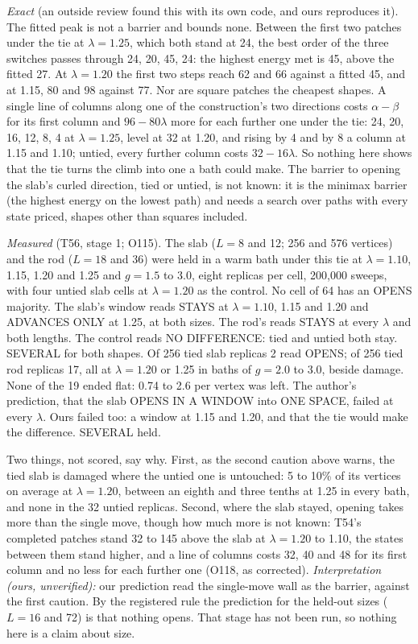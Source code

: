 \documentclass[aps,pre,10pt,twocolumn,superscriptaddress,nofootinbib]{revtex4-2}
\begin{document}
\emph{Exact} (an outside review found this with its own code, and ours reproduces it). The fitted peak is not a
barrier and bounds none. Between the first two patches under the tie at
$\lambda = 1.25$, which both stand at 24, the best order of the three switches passes through 24, 20, 45, 24: the
highest energy met is 45, above the fitted 27. At $\lambda = 1.20$ the first two steps reach 62 and 66 against a
fitted 45, and at 1.15, 80 and 98 against 77. Nor are square patches the cheapest shapes. A single line of columns
along one of the construction's two directions costs $\alpha - \beta$ for its first column and $96 - 80\lambda$ more
for each further one under the tie: 24, 20, 16, 12, 8, 4 at $\lambda = 1.25$, level at 32 at 1.20, and rising by 4
and by 8 a column at 1.15 and 1.10; untied, every further column costs $32 - 16\lambda$. So nothing here shows that the
tie turns the climb into one a bath could make. The barrier
to opening the slab's curled direction, tied or untied, is not known: it is the minimax barrier (the highest energy
on the lowest path) and needs a search over paths with every state priced, shapes other than squares included.

\emph{Measured} (T56, stage 1; O115). The slab ($L = 8$ and 12; 256 and 576 vertices) and the rod ($L = 18$ and 36)
were held in a warm bath under this tie at $\lambda = 1.10$, 1.15, 1.20 and 1.25 and $g = 1.5$ to 3.0, eight replicas
per cell, 200,000 sweeps, with four untied slab cells at $\lambda = 1.20$ as the control. No cell of 64 has an OPENS
majority. The slab's window reads STAYS at $\lambda = 1.10$, 1.15 and 1.20 and ADVANCES ONLY at 1.25, at both sizes.
The rod's reads STAYS at every $\lambda$ and both lengths. The control reads NO DIFFERENCE: tied and untied both
stay. SEVERAL for both shapes. Of 256 tied slab replicas 2 read OPENS; of 256 tied rod replicas 17, all at
$\lambda = 1.20$ or 1.25 in baths of $g = 2.0$ to 3.0, beside damage. None of the 19 ended flat: 0.74 to 2.6 per
vertex was left. The author's prediction, that the slab OPENS IN A WINDOW into ONE SPACE, failed at every $\lambda$.
Ours failed too: a window at 1.15 and 1.20, and that the tie would make the difference. SEVERAL held.

Two things, not scored, say why. First, as the second caution above warns, the tied slab is damaged where the
untied one is untouched: 5 to 10\% of its
vertices on average at $\lambda = 1.20$, between an eighth and three tenths at 1.25 in every bath, and none in the 32
untied replicas. Second, where the slab stayed, opening takes more than the single move, though how much more is not
known: T54's completed patches stand 32 to 145 above the slab at $\lambda = 1.20$ to 1.10, the states between them
stand higher, and a line of columns costs 32, 40 and 48 for its first column and no less for each further one
(O118, as corrected). \emph{Interpretation (ours, unverified):} our prediction read the single-move wall as the barrier, against the
first caution. By the registered rule the
prediction for the held-out sizes ($L = 16$ and 72) is that nothing opens. That stage has not been run, so nothing
here is a claim about size.
\end{document}
